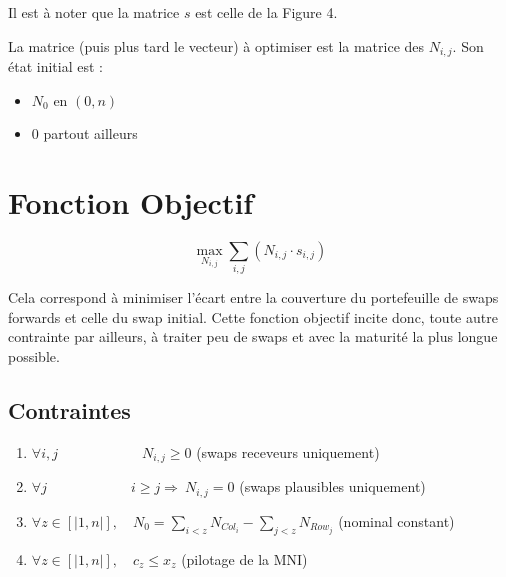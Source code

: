 \documentclass[12pt,a4paper]{report}
\begin{document}
Il est à noter que la matrice $s$ est celle de la Figure 4. 

La matrice (puis plus tard le vecteur) à optimiser est la matrice des $N_{i,j}$. Son état initial est :  
\begin{itemize}\itemsep2pt
    \item $N_0$ en $(0,n) $
    \item 0 partout ailleurs
\end{itemize}


\section{Fonction Objectif}



\[ \max_{N_{i,j}}  \sum_{i,j} ( N_{i,j} \cdot  s_{i,j} )  \]


Cela correspond à minimiser l'écart entre la couverture du portefeuille de swaps forwards et celle du swap initial.  Cette fonction objectif incite donc, toute autre contrainte par ailleurs, à  traiter peu de swaps et avec la maturité la plus longue possible.

\subsection{Contraintes}

\begin{enumerate}
    \item $ \forall i,j  \qquad \qquad \qquad  N_{i,j} \geq 0 $ \qquad \qquad \qquad  \qquad (swaps receveurs uniquement)
    \item $ \forall j   \qquad \qquad \qquad i \geq j  \Rightarrow \  N_{i,j} = 0 $ \quad \qquad  \qquad (swaps plausibles uniquement)
    \item $ \forall z \in [|1,n|], \quad N_0 = \sum\limits_{i < z} N_{Col_i} - \sum\limits_{j < z} N_{Row_j}  $ \quad (nominal constant)
    \item $ \forall z \in [|1,n|], \quad c_z \leq x_z  $  \qquad  \qquad  \qquad  \qquad  \qquad (pilotage de la MNI)
\end{enumerate}
\end{document}
